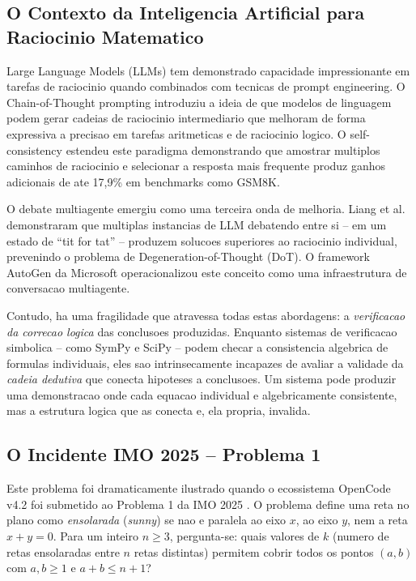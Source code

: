 \documentclass[5p]{elsarticle}
\begin{document}
\subsection{O Contexto da Inteligencia Artificial para Raciocinio Matematico}

Large Language Models (LLMs) tem demonstrado capacidade impressionante em tarefas de
raciocinio quando combinados com tecnicas de prompt engineering. O Chain-of-Thought
prompting \cite{wei2022} introduziu a ideia de que modelos de linguagem podem
gerar cadeias de raciocinio intermediario que melhoram de forma expressiva a
precisao em tarefas aritmeticas e de raciocinio logico. O self-consistency
\cite{wang2023} estendeu este paradigma demonstrando que amostrar multiplos
caminhos de raciocinio e selecionar a resposta mais frequente produz ganhos
adicionais de ate 17,9\% em benchmarks como GSM8K.

O debate multiagente emergiu como uma terceira onda de melhoria. Liang et al.
\cite{liang2023} demonstraram que multiplas instancias de LLM debatendo entre
si -- em um estado de ``tit for tat'' -- produzem solucoes superiores ao
raciocinio individual, prevenindo o problema de Degeneration-of-Thought (DoT).
O framework AutoGen da Microsoft \cite{wu2023} operacionalizou este conceito
como uma infraestrutura de conversacao multiagente.

Contudo, ha uma fragilidade que atravessa todas estas abordagens: a
\textit{verificacao da correcao logica} das conclusoes produzidas. Enquanto
sistemas de verificacao simbolica -- como SymPy \cite{meurer2017} e SciPy
\cite{virtanen2020} -- podem checar a consistencia algebrica de formulas
individuais, eles sao intrinsecamente incapazes de avaliar a validade da
\textit{cadeia dedutiva} que conecta hipoteses a conclusoes. Um sistema pode
produzir uma demonstracao onde cada equacao individual e algebricamente
consistente, mas a estrutura logica que as conecta e, ela propria, invalida.

\subsection{O Incidente IMO 2025 -- Problema 1}

Este problema foi dramaticamente ilustrado quando o ecossistema OpenCode v4.2
\cite{opencode2026} foi submetido ao Problema 1 da IMO 2025 \cite{imo2025}.
O problema define uma reta no plano como \textit{ensolarada} (\textit{sunny})
se nao e paralela ao eixo $x$, ao eixo $y$, nem a reta $x+y=0$. Para um inteiro
$n\geq 3$, pergunta-se: quais valores de $k$ (numero de retas ensolaradas entre
$n$ retas distintas) permitem cobrir todos os pontos $(a,b)$ com $a,b\geq 1$ e
$a+b\leq n+1$?
\end{document}
